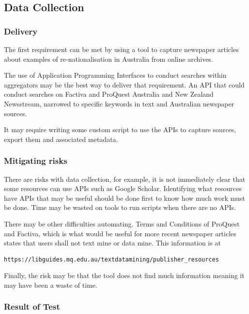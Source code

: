 \documentclass{article}
\begin{document}
\subsection*{Data Collection}
\subsubsection*{Delivery}

The first requirement can be met by using a tool to capture newspaper articles about examples of re-nationalisation in Australia from online archives.\par

The use of Application Programming Interfaces to conduct searches within aggregators may be the best way to deliver that requirement. An API that could conduct searches on Factiva and ProQuest Australia and New Zealand Newsstream, narrowed to specific keywords in text and Australian newspaper sources.\par

It may require writing some custom script to use the APIs to capture sources, export them and associated metadata.\par 

\subsubsection*{Mitigating risks}

There are risks with data collection, for example, it is not immediately clear that some resources can use APIs such as Google Scholar. Identifying what resources have APIs that may be useful should be done first to know how much work must be done. Time may be wasted on tools to run scripts when there are no APIs.\par

There may be other difficulties automating. Terms and Conditions of ProQuest and Factiva, which is what would be useful for more recent newspaper articles states that users shall not text mine or data mine. This information is at \begin{verbatim}https://libguides.mq.edu.au/textdatamining/publisher_resources\end{verbatim}

Finally, the risk may be that the tool does not find much information meaning it may have been a waste of time.\par

\subsubsection*{Result of Test}
\end{document}
